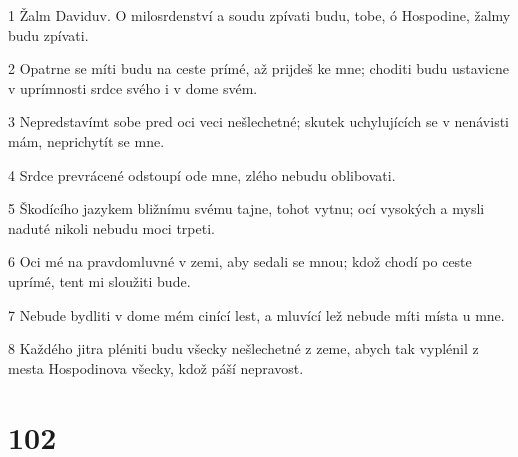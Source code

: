 \par 1 Žalm Daviduv. O milosrdenství a soudu zpívati budu, tobe, ó Hospodine, žalmy budu zpívati.
\par 2 Opatrne se míti budu na ceste prímé, až prijdeš ke mne; choditi budu ustavicne v uprímnosti srdce svého i v dome svém.
\par 3 Nepredstavímt sobe pred oci veci nešlechetné; skutek uchylujících se v nenávisti mám, neprichytít se mne.
\par 4 Srdce prevrácené odstoupí ode mne, zlého nebudu oblibovati.
\par 5 Škodícího jazykem bližnímu svému tajne, tohot vytnu; ocí vysokých a mysli naduté nikoli nebudu moci trpeti.
\par 6 Oci mé na pravdomluvné v zemi, aby sedali se mnou; kdož chodí po ceste uprímé, tent mi sloužiti bude.
\par 7 Nebude bydliti v dome mém cinící lest, a mluvící lež nebude míti místa u mne.
\par 8 Každého jitra pléniti budu všecky nešlechetné z zeme, abych tak vyplénil z mesta Hospodinova všecky, kdož páší nepravost.

\chapter{102}

